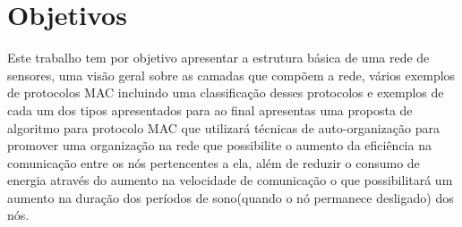\section{Objetivos}

Este trabalho tem por objetivo apresentar a estrutura básica de uma rede de sensores, uma visão geral sobre as camadas que compõem a rede, vários exemplos de protocolos MAC incluindo uma classificação desses protocolos e exemplos de cada um dos tipos apresentados para ao final apresentas uma proposta de algoritmo para protocolo MAC que utilizará técnicas de auto-organização para promover uma organização na rede que possibilite o aumento da eficiência na comunicação entre os nós pertencentes a ela, além de reduzir o consumo de energia através do aumento na velocidade de comunicação o que possibilitará um aumento na duração dos períodos de sono(quando o nó permanece desligado) dos nós.
